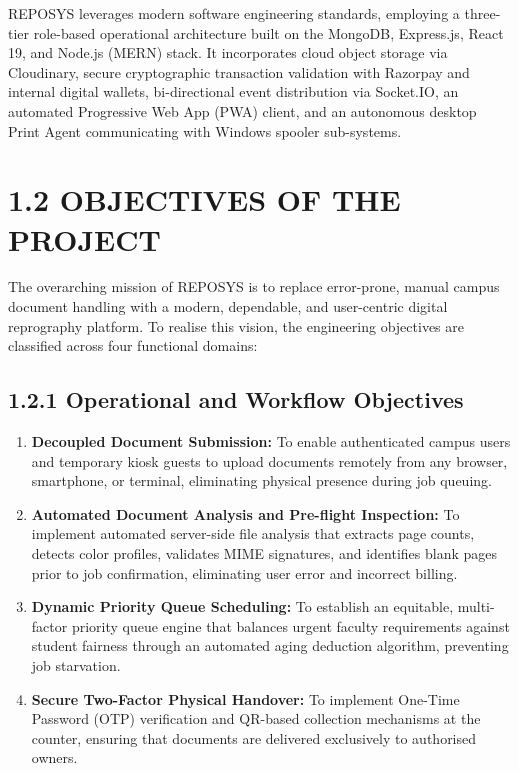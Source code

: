 \documentclass[12pt,a4paper,oneside]{report}
\begin{document}
REPOSYS leverages modern software engineering standards, employing a three-tier role-based operational architecture built on the MongoDB, Express.js, React 19, and Node.js (MERN) stack. It incorporates cloud object storage via Cloudinary, secure cryptographic transaction validation with Razorpay and internal digital wallets, bi-directional event distribution via Socket.IO, an automated Progressive Web App (PWA) client, and an autonomous desktop Print Agent communicating with Windows spooler sub-systems.

\section{1.2 OBJECTIVES OF THE PROJECT}
The overarching mission of REPOSYS is to replace error-prone, manual campus document handling with a modern, dependable, and user-centric digital reprography platform. To realise this vision, the engineering objectives are classified across four functional domains:

\subsection{1.2.1 Operational and Workflow Objectives}
\begin{enumerate}[leftmargin=0.35in, itemsep=2pt]
  \item \textbf{Decoupled Document Submission:} To enable authenticated campus users and temporary kiosk guests to upload documents remotely from any browser, smartphone, or terminal, eliminating physical presence during job queuing.
  \item \textbf{Automated Document Analysis and Pre-flight Inspection:} To implement automated server-side file analysis that extracts page counts, detects color profiles, validates MIME signatures, and identifies blank pages prior to job confirmation, eliminating user error and incorrect billing.
  \item \textbf{Dynamic Priority Queue Scheduling:} To establish an equitable, multi-factor priority queue engine that balances urgent faculty requirements against student fairness through an automated aging deduction algorithm, preventing job starvation.
  \item \textbf{Secure Two-Factor Physical Handover:} To implement One-Time Password (OTP) verification and QR-based collection mechanisms at the counter, ensuring that documents are delivered exclusively to authorised owners.
\end{enumerate}
\end{document}
